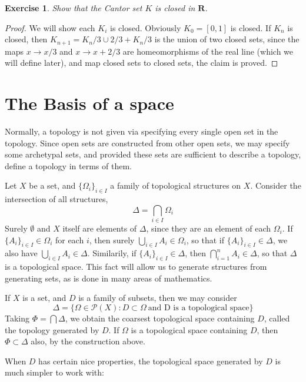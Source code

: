 \documentclass{report}
\theoremstyle{plain}
\newtheorem{exercise}{Exercise}[section]
\theoremstyle{definition}
\begin{document}
\begin{exercise}
    Show that the Cantor set $K$ is closed in $\mathbf{R}$.
\end{exercise}
\begin{proof}
    We will show each $K_i$ is closed. Obviously $K_0 = [0,1]$ is closed. If $K_n$ is closed, then $K_{n+1} = K_n/3 \cup 2/3 + K_n/3$ is the union of two closed sets, since the maps $x \to x/3$ and $x \to x + 2/3$ are homeomorphisms of the real line (which we will define later), and map closed sets to closed sets, the claim is proved.
\end{proof}

\section{The Basis of a space}

Normally, a topology is not given via specifying every single open set in the topology. Since open sets are constructed from other open sets, we may specify some archetypal sets, and provided these sets are sufficient to describe a topology, define a topology in terms of them.

Let $X$ be a set, and $\{\Omega_i\}_{i \in I}$ a family of topological structures on $X$. Consider the intersection of all structures,
%
\[ \Delta = \bigcap_{i \in I} \Omega_i \]
%
Surely $\emptyset$ and $X$ itself are elements of $\Delta$, since they are an element of each $\Omega_i$. If $\{A_i\}_{i \in I} \in \Omega_i$ for each $i$, then surely $\bigcup_{i \in I} A_i \in \Omega_i$, so that if $\{A_i\}_{i \in I} \in \Delta$, we also have $\bigcup_{i \in I} A_i \in \Delta$. Similarily, if $\{A_i\}_{i \in I} \in \Delta$, then $\bigcap_{i = 1}^n A_i \in \Delta$, so that $\Delta$ is a topological space. This fact will allow us to generate structures from generating sets, as is done in many areas of mathematics.

If $X$ is a set, and $D$ is a family of subsets, then we may consider
%
\[ \Delta = \{ \Omega \in \mathcal{P}(X) : D \subset \Omega\ \text{and D is a topological space} \} \]
%
Taking $\Phi = \bigcap \Delta$, we obtain the coarsest topological space containing $D$, called the topology generated by $D$. If $\Omega$ is a topological space containing $D$, then $\Phi \subset \Delta$ also, by the construction above.

When $D$ has certain nice properties, the topological space generated by $D$ is much simpler to work with:
\end{document}
